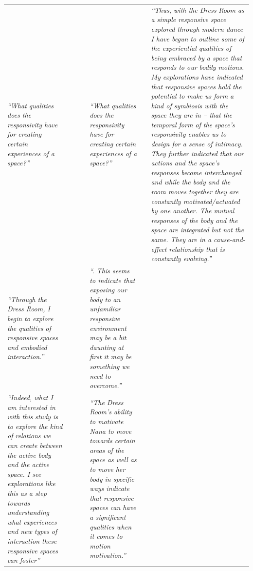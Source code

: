 \begin{landscape}
\begin{table}[p]
\begin{tabularx}{\linewidth}{@{}
    p{.16\linewidth}
    p{.12\linewidth}
    p{.10\linewidth}
    p{.13\linewidth}
    p{.20\linewidth}
    p{.12\linewidth}
    X
  @{}}
        \emph{``What qualities does the responsivity have for creating certain experiences of a space?''} & & & & \emph{``What qualities does the responsivity have for creating certain experiences of a space?''} & & \emph{``Thus, with the Dress Room as a simple responsive space explored through modern dance I have begun to outline some of the experiential qualities of being embraced by a space that responds to our bodily motions. My explorations have indicated that responsive spaces hold the potential to make us form a kind of symbiosis with the space they are in – that the temporal form of the space’s responsivity enables us to design for a sense of intimacy. They further indicated that our actions and the space’s responses become interchanged and while the body and the room moves together they are constantly motivated/actuated by one another. The mutual responses of the body and the space are integrated but not the same. They are in a cause-and-effect relationship that is constantly evolving.''} \\
        \emph{``Through the Dress Room, I begin to explore the qualities of responsive spaces and embodied interaction.''} & & & & \emph{``. This seems to indicate that exposing our body to an unfamiliar responsive environment may be a bit daunting at first it may be something we need to overcome.''} & & \\
        \emph{``Indeed, what I am interested in with this study is to explore the kind of relations we can create between the active body and the active space. I see explorations like this as a step towards understanding what experiences and new types of interaction these responsive spaces can foster''} & & & & \emph{``The Dress Room’s ability to motivate Nana to move towards certain areas of the space as well as to move her body in specific ways indicate that responsive spaces can have a significant qualities when it comes to motion motivation.''} & &  \\

\end{tabularx}
\end{table}
\end{landscape}
